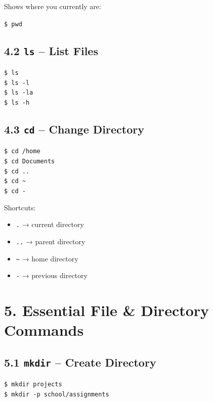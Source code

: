 \documentclass[12pt]{article}
\begin{document}
Shows where you currently are:

\begin{highlightbox}
\texttt{\$ pwd}
\end{highlightbox}

\subsection*{4.2 \texttt{ls} – List Files}

\begin{highlightbox}
\texttt{\$ ls}\\
\texttt{\$ ls -l}\\
\texttt{\$ ls -la}\\
\texttt{\$ ls -h}
\end{highlightbox}

\subsection*{4.3 \texttt{cd} – Change Directory}

\begin{highlightbox}
\texttt{\$ cd /home}\\
\texttt{\$ cd Documents}\\
\texttt{\$ cd ..}\\
\texttt{\$ cd \textasciitilde}\\
\texttt{\$ cd -}
\end{highlightbox}

Shortcuts:

\begin{itemize}
    \item \texttt{.} → current directory
    \item \texttt{..} → parent directory
    \item \texttt{\textasciitilde} → home directory
    \item \texttt{-} → previous directory
\end{itemize}

\section*{5. Essential File \& Directory Commands}

\subsection*{5.1 \texttt{mkdir} – Create Directory}

\begin{highlightbox}
\texttt{\$ mkdir projects}\\
\texttt{\$ mkdir -p school/assignments}
\end{highlightbox}
\end{document}

